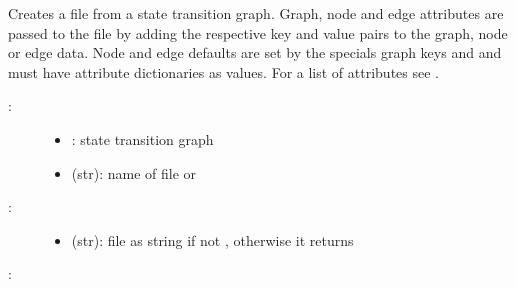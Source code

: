 \documentclass[letterpaper,10pt,english]{sphinxmanual}
\begin{document}
\begin{fulllineitems}
\label{\detokenize{StateTransitionGraphs:PyBoolNet.StateTransitionGraphs.stg2dot}}
Creates a  file from a state transition graph.
Graph, node and edge attributes are passed to the  file by adding the respective key and value pairs to the graph, node or edge data.
Node and edge defaults are set by the specials graph keys  and  and must have attribute dictionaries as values.
For a list of attributes see .
\begin{description}
\item[{:}] \leavevmode\begin{itemize}
\item {} 
: state transition graph

\item {} 
 (str): name of  file or 

\end{itemize}

\item[{:}] \leavevmode\begin{itemize}
\item {} 
 (str): file as string if not , otherwise it returns 

\end{itemize}

\end{description}

:


\end{fulllineitems}
\end{document}
